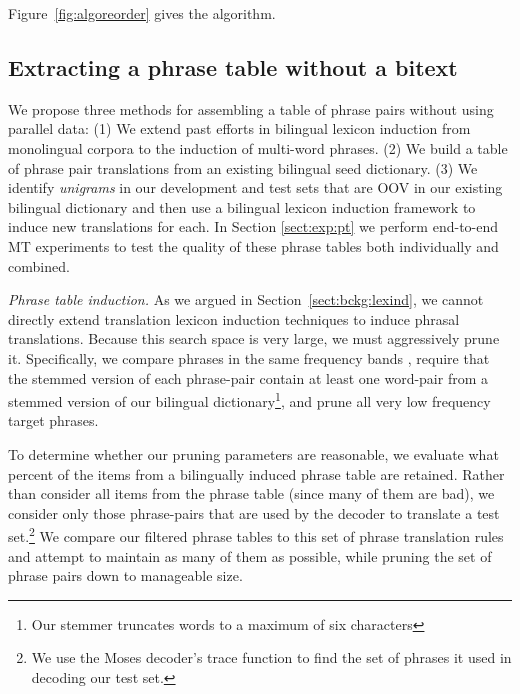 \documentclass[11pt]{article}
\newcommand{\mnote}[1]{\marginpar{%
  \vskip-\baselineskip
  \raggedright\footnotesize
  \itshape\hrule\smallskip\tiny{#1}\par\smallskip\hrule}}
\newcommand{\mtodo}[1]{\mnote{\textcolor{red}{#1}}}
\newcommand{\todo}[1]{\textcolor{red}{TODO: #1}}
\newcommand{\secref}[1]{Section~\ref{#1}}
\newcommand{\figref}[1]{Figure~\ref{#1}}
\newcommand{\paraheader}[1]{\vskip 0.05in \noindent\emph{#1}}
\begin{document}
\figref{fig:algoreorder} gives the algorithm.

\subsection{Extracting a phrase table without a bitext}  \label{sect:extract}
We propose three methods for assembling a table of phrase pairs without using parallel data: (1) We extend past efforts in bilingual lexicon induction from monolingual corpora to the induction of multi-word phrases. (2) We build a table of phrase pair translations from an existing bilingual seed dictionary. (3) We identify \emph {unigrams} in our development and test sets that are OOV in our existing bilingual dictionary and then use a bilingual lexicon induction framework \cite{Rapp:1995} to induce new translations for each. In Section \ref{sect:exp:pt} we perform end-to-end MT experiments to test the quality of these phrase tables both individually and combined.

\paraheader{Phrase table induction.} As we argued in \secref{sect:bckg:lexind}, we cannot directly extend translation lexicon induction techniques to induce phrasal translations.  Because this search space is very large, we must aggressively prune it.   Specifically, we compare phrases in the same frequency bands \cite{Uszkoreit:2010}, require that the stemmed version of each phrase-pair contain at least one word-pair from a stemmed version of our bilingual dictionary\footnote{Our stemmer truncates words to a maximum of six characters}, and prune all very low frequency target phrases. %

To determine whether our pruning parameters are reasonable, we evaluate what percent of the items from a bilingually induced phrase table are retained.  Rather than consider all items from the phrase table (since many of them are bad), we consider only those phrase-pairs that are used by the decoder to translate a test set.\footnote{We use the Moses decoder's trace function to find the set of phrases it used in decoding our test set.} We compare our filtered phrase tables to this set of phrase translation rules and attempt to maintain as many of them as possible, while pruning the set of phrase pairs down to manageable size.
\end{document}
